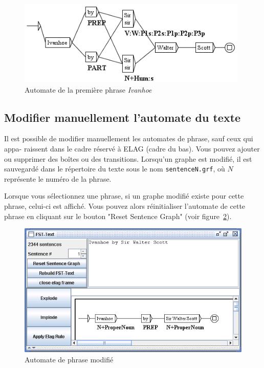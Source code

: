 \begin{figure}[!ht]
\begin{center}
\includegraphics[width=11cm]{resources/img/fig7-23.png}
\caption{Automate de la première phrase \textit{Ivanhoe}\label{fig-first-sentence-Ivanhoe}}
\end{center}
\end{figure}

\subsection{Modifier manuellement l’automate du texte}
Il est possible de modifier manuellement les automates de phrase, sauf ceux qui appa-
raissent dans le cadre réservé à ELAG (cadre du bas). Vous pouvez ajouter ou supprimer des
boîtes ou des transitions. Lorsqu’un graphe est modifié, il est sauvegardé dans le répertoire
du texte sous le nom \verb+sentenceN.grf+, où $N$ représente le numéro de la phrase.

\bigskip
\noindent Lorsque vous sélectionnez une phrase, si un graphe modifié existe pour cette phrase,
celui-ci est affiché. Vous pouvez alors réinitialiser l’automate de cette phrase en cliquant sur
le bouton "Reset Sentence Graph" (voir figure~\ref{fig-modified-sentence-automaton}).

\begin{figure}[!ht]
\begin{center}
\includegraphics[width=15cm]{resources/img/fig7-24.png}
\caption{Automate de phrase modifié\label{fig-modified-sentence-automaton}}
\end{center}
\end{figure}

